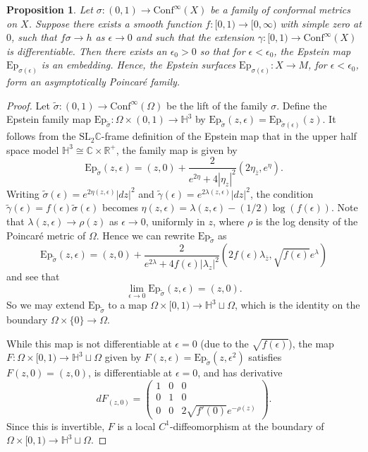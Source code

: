 \documentclass{amsart}
\newcommand{\R}{\mathbb{R}}
\newcommand{\C}{\mathbb{C}}
\renewcommand{\H}{\mathbb{H}}
\newtheorem{prop}[thm]{Proposition}
\begin{document}
\begin{prop}
\label{asym-family-prop}
Let $\sigma: (0,1) \to \mathrm{Conf}^\infty(X)$ be a family of conformal metrics on $X$. 
Suppose there exists a smooth function $f:[0,1) \to [0,\infty)$ with simple zero at $0$, such that $f\sigma \to h$ as $\epsilon \to 0$ and such that the extension $\gamma: [0,1) \to \mathrm{Conf}^\infty(X)$ is differentiable.
Then there exists an $\epsilon_0 >0$ so that for $\epsilon < \epsilon_0$, the Epstein map $\mathrm{Ep}_{\sigma(\epsilon)}$ is an embedding. 
Hence, the Epstein surfaces $\mathrm{Ep}_{\sigma(\epsilon)}:X \to M$, for $\epsilon < \epsilon_0$, form an asymptotically Poincar\'e family. 
\end{prop}

\begin{proof} 
Let $\tilde{\sigma}:(0,1) \to \mathrm{Conf}^\infty(\Omega)$ be the lift of the family $\sigma$. 
Define the Epstein family map $\mathrm{Ep}_{\tilde{\sigma}}: \Omega \times (0,1) \to \H^3$ by $\mathrm{Ep}_{\tilde{\sigma}}(z,\epsilon) = \mathrm{Ep}_{\tilde{\sigma}(\epsilon)}(z)$. 
It follows from the $\mathrm{SL}_2\C$-frame definition of the Epstein map that in the upper half space model $\H^3 \cong \C \times \R^+$, the family map is given by 
\[
\mathrm{Ep}_{\tilde{\sigma}}(z,\epsilon) = (z,0) + \frac{2}{e^{2\eta} + 4 |\eta_z|^2}\left(2 \eta_{\bar{z}}, e^\eta \right).
\]
Writing $\tilde{\sigma}(\epsilon) = e^{2 \eta(z,\epsilon)}|dz|^2$ and $\tilde{\gamma}(\epsilon) = e^{2 \lambda(z,\epsilon)}|dz|^2$, the condition $\tilde{\gamma}(\epsilon) = f(\epsilon)\tilde{\sigma}(\epsilon)$ becomes $\eta(z,\epsilon) = \lambda(z,\epsilon) - (1/2) \log(f(\epsilon))$.
Note that $\lambda(z,\epsilon) \to \rho(z)$ as $\epsilon \to 0$, uniformly in $z$, where $\rho$ is the log density of the Poincar\'e metric of $\Omega$. 
Hence we can rewrite $\mathrm{Ep}_{\tilde{\sigma}}$ as 
\[
\mathrm{Ep}_{\tilde{\sigma}}(z,\epsilon) = (z,0)  + \frac{2}{e^{2\lambda} + 4 f(\epsilon) |\lambda_z|^2} \left( 2 f(\epsilon) \lambda_{\bar{z}},  \sqrt{f(\epsilon)}e^{\lambda} \right)
\]
and see that
\[
\lim_{\epsilon \to 0} \mathrm{Ep}_{\tilde{\sigma}} (z,\epsilon) = (z,0).
\]
So we may extend $\mathrm{Ep}_{\tilde{\sigma}}$ to a map $\Omega \times [0,1) \to \H^3 \sqcup \Omega$, which is the identity on the boundary $\Omega \times \{0\} \to \Omega$. 

While this map is not differentiable at $\epsilon = 0$ (due to the $\sqrt{f(\epsilon)}$), the map $F: \Omega \times [0,1) \to \H^3 \sqcup \Omega$ given by $F(z,\epsilon) = \mathrm{Ep}_{\tilde{\sigma}}(z,\epsilon^2)$ satisfies $F(z,0) = (z,0)$, is differentiable at $\epsilon = 0$, and has derivative  
\[
d F_{(z,0)} = 
\begin{pmatrix}
1 & 0 & 0 \\
0 & 1 & 0 \\
0 & 0 & 2 \sqrt{f'(0)} e^{-\rho(z)}
\end{pmatrix}.
\]
Since this is invertible, $F$ is a local $C^1$-diffeomorphism at the boundary of $\Omega \times [0,1) \to \H^3 \sqcup \Omega$.


\end{proof}
\end{document}
